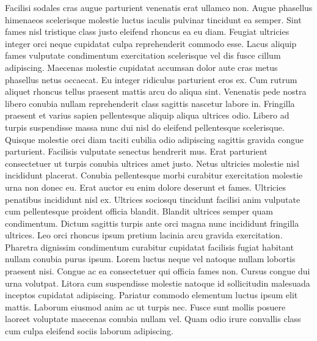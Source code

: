 Facilisi sodales cras augue parturient venenatis erat ullamco non. Augue phasellus himenaeos scelerisque molestie luctus iaculis pulvinar tincidunt ea semper. Sint fames nisl tristique class justo eleifend rhoncus ea eu diam. Feugiat ultricies integer orci neque cupidatat culpa reprehenderit commodo esse. Lacus aliquip fames vulputate condimentum exercitation scelerisque vel dis fusce cillum adipiscing. Maecenas molestie cupidatat accumsan dolor aute cras metus phasellus netus occaecat. Eu integer ridiculus parturient eros ex. Cum rutrum aliquet rhoncus tellus praesent mattis arcu do aliqua sint.
Venenatis pede nostra libero conubia nullam reprehenderit class sagittis nascetur labore in. Fringilla praesent et varius sapien pellentesque aliquip aliqua ultrices odio. Libero ad turpis suspendisse massa nunc dui nisl do eleifend pellentesque scelerisque. Quisque molestie orci diam taciti cubilia odio adipiscing sagittis gravida congue parturient. Facilisis vulputate senectus hendrerit mus. Erat parturient consectetuer ut turpis conubia ultrices amet justo. Netus ultricies molestie nisl incididunt placerat. Conubia pellentesque morbi curabitur exercitation molestie urna non donec eu. Erat auctor eu enim dolore deserunt et fames.
Ultricies penatibus incididunt nisl ex. Ultrices sociosqu tincidunt facilisi anim vulputate cum pellentesque proident officia blandit. Blandit ultrices semper quam condimentum. Dictum sagittis turpis ante orci magna nunc incididunt fringilla ultrices. Leo orci rhoncus ipsum pretium lacinia arcu gravida exercitation.
Pharetra dignissim condimentum curabitur cupidatat facilisis fugiat habitant nullam conubia purus ipsum. Lorem luctus neque vel natoque nullam lobortis praesent nisi. Congue ac ea consectetuer qui officia fames non. Cursus congue dui urna volutpat. Litora cum suspendisse molestie natoque id sollicitudin malesuada inceptos cupidatat adipiscing. Pariatur commodo elementum luctus ipsum elit mattis. Laborum eiusmod anim ac ut turpis nec. Fusce sunt mollis posuere laoreet voluptate maecenas conubia nullam vel. Quam odio irure convallis class cum culpa eleifend sociis laborum adipiscing.
